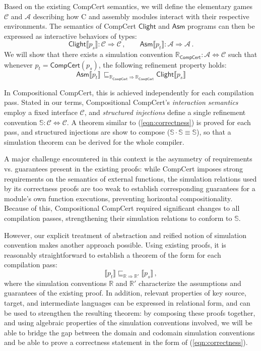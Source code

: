 \documentclass[acmsmall,timestamp,review,anonymous]{acmart}
\newcommand{\kw}[1]{\ensuremath{ \mathsf{#1} }}
\begin{document}
Based on the existing CompCert semantics,
we will define the elementary games
$\mathcal{C}$ and $\mathcal{A}$
describing how C and assembly modules
interact with their respective environments.
The semantics of CompCert $\kw{Clight}$ and $\kw{Asm}$ programs
can then be expressed as interactive behaviors of types:
\[
    \kw{Clight} \llbracket p_s \rrbracket :
      \mathcal{C} \Rightarrow \mathcal{C} \,, \qquad
    \kw{Asm} \llbracket p_t \rrbracket :
      \mathcal{A} \Rightarrow \mathcal{A} \,.
\]
We will show that there exists a simulation convention
$\mathbb{R}_\kw{CompCert} : \mathcal{A} \Leftrightarrow \mathcal{C}$
such that whenever $p_t = \kw{CompCert}(p_s)$,
the following refinement property holds:
\begin{equation}
    \label{eqn:correctness}
    \kw{Asm} \llbracket p_t \rrbracket \,
    \sqsubseteq_{\mathbb{R}_\kw{CompCert} \Rightarrow \mathbb{R}_\kw{CompCert}}
    \kw{Clight} \llbracket p_s \rrbracket
\end{equation}

In Compositional CompCert,
this is achieved independently for each compilation pass.
Stated in our terms,
Compositional CompCert's \emph{interaction semantics}
employ a fixed interface $\mathcal{C}$,
and \emph{structured injections} define a single refinement convention
$\mathbb{S} : \mathcal{C} \Leftrightarrow \mathcal{C}$.
A theorem similar to (\ref{eqn:correctness}) is proved for each pass,
and structured injections are show to compose
($\mathbb{S} \cdot \mathbb{S} \equiv \mathbb{S}$),
so that a simulation theorem can be derived for the whole compiler.

A major challenge encountered in this context
is the asymmetry of requirements vs. guarantees
present in the existing proofs:
while CompCert imposes strong requirements
on the semantics of external functions,
the simulation relations used by its correctness proofs
are too weak to establish corresponding guarantees
for a module's own function executions,
preventing horizontal compositionality.
Because of this,
Compositional CompCert required significant changes
to all compilation passes,
strengthening their simulation relations
to conform to $\mathbb{S}$.

However,
our explicit treatment of abstraction
and reified notion of simulation convention
makes another approach possible.
Using existing proofs, it is reasonably straightforward
to establish a theorem of the form
for each compilation pass:
\begin{equation}
    \label{correctness-alt}
    \llbracket p_t \rrbracket
    \sqsubseteq_{\mathbb{R} \Rightarrow \mathbb{R}'}
    \llbracket p_s \rrbracket \,,
\end{equation}
where the simulation conventions $\mathbb{R}$ and $\mathbb{R}'$
characterize the assumptions and guarantees
of the existing proof.
In addition,
relevant properties of key source, target, and intermediate languages
can be expressed in relational form,
and can be used to strengthen the resulting theorem:
by composing these proofs together,
and using algebraic properties of
the simulation conventions involved,
we will be able to bridge the gap
between the domain and codomain simulation conventions
and be able to prove a correctness statement
in the form of (\ref{eqn:correctness}).
\end{document}
